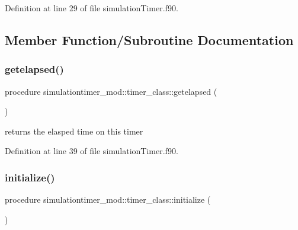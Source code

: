 Definition at line 29 of file simulation\+Timer.\+f90.



\subsection{Member Function/\+Subroutine Documentation}
\mbox{\label{structsimulationtimer__mod_1_1timer__class_a8d93e7223e1bbd78bc38c72e88fd2e41}} 
\subsubsection{\texorpdfstring{getelapsed()}{getelapsed()}}
{\footnotesize\ttfamily procedure simulationtimer\+\_\+mod\+::timer\+\_\+class\+::getelapsed (\begin{DoxyParamCaption}{ }\end{DoxyParamCaption})\hspace{0.3cm}{\ttfamily [private]}}



returns the elasped time on this timer 



Definition at line 39 of file simulation\+Timer.\+f90.

\mbox{\label{structsimulationtimer__mod_1_1timer__class_a5ff00a291d05b6135e421e4b5718c810}} 
\subsubsection{\texorpdfstring{initialize()}{initialize()}}
{\footnotesize\ttfamily procedure simulationtimer\+\_\+mod\+::timer\+\_\+class\+::initialize (\begin{DoxyParamCaption}{ }\end{DoxyParamCaption})\hspace{0.3cm}{\ttfamily [private]}}



